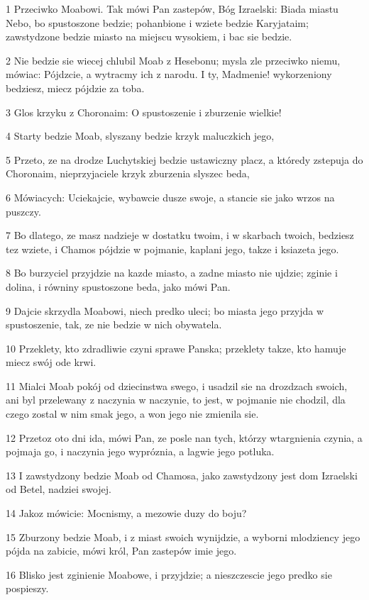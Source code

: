 \par 1 Przeciwko Moabowi. Tak mówi Pan zastepów, Bóg Izraelski: Biada miastu Nebo, bo spustoszone bedzie; pohanbione i wziete bedzie Karyjataim; zawstydzone bedzie miasto na miejscu wysokiem, i bac sie bedzie.
\par 2 Nie bedzie sie wiecej chlubil Moab z Hesebonu; mysla zle przeciwko niemu, mówiac: Pójdzcie, a wytracmy ich z narodu. I ty, Madmenie! wykorzeniony bedziesz, miecz pójdzie za toba.
\par 3 Glos krzyku z Choronaim: O spustoszenie i zburzenie wielkie!
\par 4 Starty bedzie Moab, slyszany bedzie krzyk maluczkich jego,
\par 5 Przeto, ze na drodze Luchytskiej bedzie ustawiczny placz, a któredy zstepuja do Choronaim, nieprzyjaciele krzyk zburzenia slyszec beda,
\par 6 Mówiacych: Uciekajcie, wybawcie dusze swoje, a stancie sie jako wrzos na puszczy.
\par 7 Bo dlatego, ze masz nadzieje w dostatku twoim, i w skarbach twoich, bedziesz tez wziete, i Chamos pójdzie w pojmanie, kaplani jego, takze i ksiazeta jego.
\par 8 Bo burzyciel przyjdzie na kazde miasto, a zadne miasto nie ujdzie; zginie i dolina, i równiny spustoszone beda, jako mówi Pan.
\par 9 Dajcie skrzydla Moabowi, niech predko uleci; bo miasta jego przyjda w spustoszenie, tak, ze nie bedzie w nich obywatela.
\par 10 Przeklety, kto zdradliwie czyni sprawe Panska; przeklety takze, kto hamuje miecz swój ode krwi.
\par 11 Mialci Moab pokój od dziecinstwa swego, i usadzil sie na drozdzach swoich, ani byl przelewany z naczynia w naczynie, to jest, w pojmanie nie chodzil, dla czego zostal w nim smak jego, a won jego nie zmienila sie.
\par 12 Przetoz oto dni ida, mówi Pan, ze posle nan tych, którzy wtargnienia czynia, a pojmaja go, i naczynia jego wypróznia, a lagwie jego potluka.
\par 13 I zawstydzony bedzie Moab od Chamosa, jako zawstydzony jest dom Izraelski od Betel, nadziei swojej.
\par 14 Jakoz mówicie: Mocnismy, a mezowie duzy do boju?
\par 15 Zburzony bedzie Moab, i z miast swoich wynijdzie, a wyborni mlodziency jego pójda na zabicie, mówi król, Pan zastepów imie jego.
\par 16 Blisko jest zginienie Moabowe, i przyjdzie; a nieszczescie jego predko sie pospieszy.
